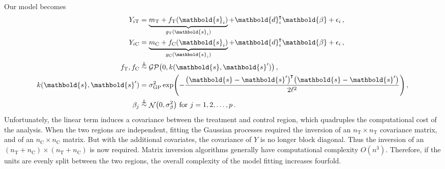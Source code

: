 \documentclass[letter]{article}
\DeclarePairedDelimiter{\parenthesis}{\lparen}{\rparen}
\newcommand{\del}[1]{\parenthesis*{#1}}
\DeclareMathOperator{\normal}{\mathcal{N}}
\newcommand{\gp}{\mathcal{GP}}
\newcommand*{\trans}{^{\mkern-1.5mu\intercal}}
\newcommand{\treat}{\mathrm{T}}
\newcommand{\ctrol}{\mathrm{C}}
\newcommand{\sigmaf}{\sigma_{\mathrm{GP}}}
\newcommand{\sigmabeta}{\sigma_{\beta}}
\newcommand{\svec}{\mathbold{s}}
\newcommand{\dvec}{\mathbold{d}}
\newcommand{\betavec}{\mathbold{\beta}}
\newcommand{\indep}{\protect\mathpalette{\protect\independenT}{\perp}}
\def\independenT#1#2{\mathrel{\rlap{$#1#2$}\mkern2mu{#1#2}}}
\newcommand{\eqlabel}[1]{\label{#1}}
\begin{document}
Our model becomes
\begin{equation}
\begin{split}
Y_{i\treat} &= \underbrace{m_\treat{} + f_\treat{}(\svec_i)}_{g_\treat{}(\svec_i)} + \dvec_i\trans \betavec + \epsilon_i\,, \\
Y_{i\ctrol} &= \underbrace{m_\ctrol{} + f_\ctrol{}(\svec_i)}_{g_\ctrol{}(\svec_i)} + \dvec_i\trans \betavec + \epsilon_i\,, \\
f_\treat{}, f_\ctrol{} &\overset{\indep}{\sim} \gp\del{0, k(\svec, \svec')}\,, \\
k(\svec,\svec') &= \sigmaf^2 \exp\del{ - \frac{\del{\svec-\svec'}\trans\del{\svec-\svec'}}{2 \ell^2}}\,, \\
\beta_j &\overset{\indep}{\sim} \normal\del{0,\sigmabeta^2}\text{ for }j=1,2,\dotsc,p \,.
\end{split}
\eqlabel{eq:covariates_model}
\end{equation}
Unfortunately, the linear term induces a covariance between the treatment and control region, which quadruples the computational cost of the analysis.
When the two regions are independent, fitting the Gaussian processes required the inversion of an \(n_\treat{} \times n_\treat{}\) covariance matrix, and of an \(n_\ctrol{} \times n_\ctrol{}\) matrix.
But with the additional covariates, the covariance of \(Y\) is no longer block diagonal.
Thus the inversion of an \((n_\treat{}+n_\ctrol{}) \times (n_\treat{}+n_\ctrol{})\) is now required.
Matrix inversion algorithms generally have computational complexity \(O(n^3)\).
Therefore, if the units are evenly split between the two regions,
the overall complexity of the model fitting increases fourfold.
    
\end{document}
